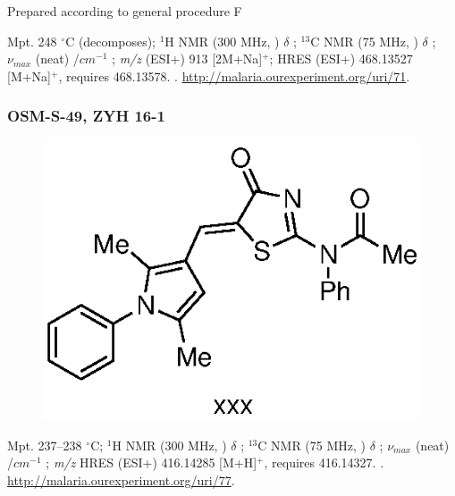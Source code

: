\documentclass[12pt, a4paper,titlepage]{article}
\begin{document}
{Prepared according to general procedure F

Mpt. 248 $^\circ$C (decomposes); 
$^1$H NMR (300 MHz, ) $\delta$ ; 
  $^{13}$C NMR (75 MHz, ) $\delta$ ; 
 $\nu_{max}$ (neat) /$cm^{-1}$ ; 
\emph{m/z} (ESI+) 913 [2M+Na]$^+$; HRES (ESI+) 468.13527 [M+Na]$^+$,  requires 468.13578.
. 
\url{http://malaria.ourexperiment.org/uri/71}. 

\subsubsection*{OSM-S-49, ZYH 16-1}
\label{exp:ZYH16}
	\begin{figure}[H]
	\begin{center}
	\includegraphics{exp/ZYH16.eps}
	\end{center}
	\vspace{-25pt}	
	\end{figure}

Mpt. 237--238 $^\circ$C; 
$^1$H NMR (300 MHz, ) $\delta$ ; 
  $^{13}$C NMR (75 MHz, ) $\delta$ ; 
 $\nu_{max}$ (neat) /$cm^{-1}$ ; 
\emph{m/z} HRES (ESI+) 416.14285 [M+H]$^+$,  requires 416.14327.
. 
\url{http://malaria.ourexperiment.org/uri/77}. 

}
\end{document}
